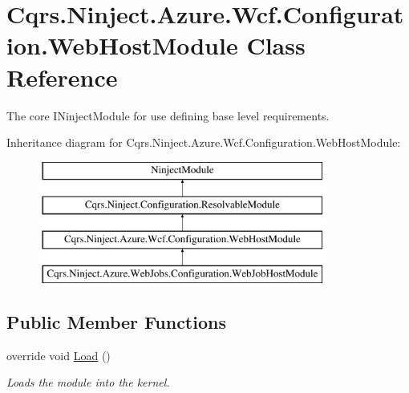 \hypertarget{classCqrs_1_1Ninject_1_1Azure_1_1Wcf_1_1Configuration_1_1WebHostModule}{}\section{Cqrs.\+Ninject.\+Azure.\+Wcf.\+Configuration.\+Web\+Host\+Module Class Reference}
\label{classCqrs_1_1Ninject_1_1Azure_1_1Wcf_1_1Configuration_1_1WebHostModule}


The core I\+Ninject\+Module for use defining base level requirements.  


Inheritance diagram for Cqrs.\+Ninject.\+Azure.\+Wcf.\+Configuration.\+Web\+Host\+Module\+:\begin{figure}[H]
\begin{center}
\leavevmode
\includegraphics[height=4.000000cm]{classCqrs_1_1Ninject_1_1Azure_1_1Wcf_1_1Configuration_1_1WebHostModule}
\end{center}
\end{figure}
\subsection*{Public Member Functions}
\begin{DoxyCompactItemize}
\item 
override void \hyperlink{classCqrs_1_1Ninject_1_1Azure_1_1Wcf_1_1Configuration_1_1WebHostModule_acac355ad5f368268e5d2f6a6d1804f94_acac355ad5f368268e5d2f6a6d1804f94}{Load} ()
\begin{DoxyCompactList}\small\item\em Loads the module into the kernel. \end{DoxyCompactList}\end{DoxyCompactItemize}
